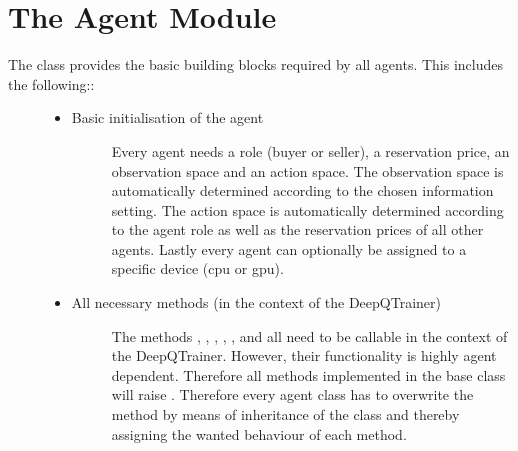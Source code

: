 \documentclass[letterpaper,10pt,english]{sphinxmanual}
\begin{document}
\section{The Agent Module}
\label{\detokenize{MultiAgentMarketRL:the-agent-module}}\begin{description}
\item[{The  class provides the basic building blocks required by all agents. This includes the following::}] \leavevmode\begin{itemize}
\item {} \begin{description}
\item[{Basic initialisation of the agent}] \leavevmode
\sphinxAtStartPar
Every agent needs a role (buyer or seller), a reservation price, an observation space and an action space.
The observation space is automatically determined according to the chosen information setting. The action space
is automatically determined according to the agent role as well as the reservation prices of all other agents.
Lastly every agent can optionally be assigned to a specific device (cpu or gpu).

\end{description}

\item {} \begin{description}
\item[{All necessary methods (in the context of the DeepQTrainer)}] \leavevmode
\sphinxAtStartPar
The methods , , , , ,
 and  all need to be callable in the context of the DeepQTrainer.
However, their functionality is highly agent dependent. Therefore all methods implemented in the 
base class will raise . Therefore every agent class has to overwrite the 
method by means of inheritance of the  class and thereby assigning the wanted behaviour of each
method.

\end{description}

\end{itemize}

\end{description}
\end{document}
